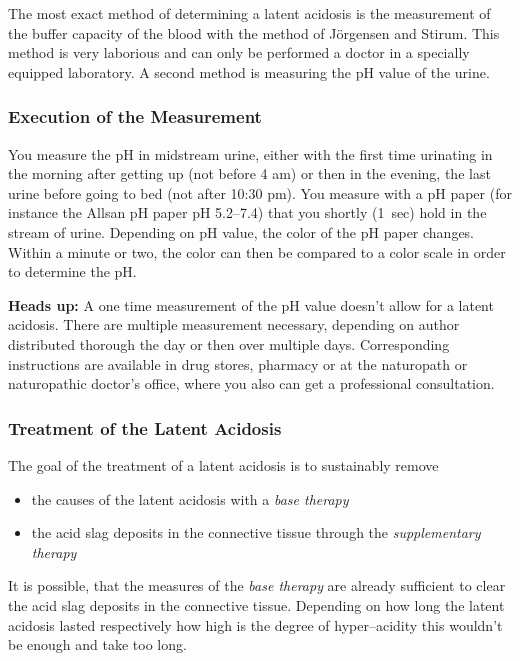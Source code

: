 \documentclass[../main.tex]{subfiles}
\begin{document}
  The most exact method of determining a latent acidosis is the measurement of the buffer capacity of the blood with the method of J\"orgensen and Stirum.
  This method is very laborious and can only be performed a doctor in a specially equipped laboratory.
  A second method is measuring the pH value of the urine.
  
  \subsubsection{Execution of the Measurement}

  You measure the pH in midstream urine, either with the first time urinating in the morning after getting up (not before 4 am) or then in the evening,
  the last urine before going to bed (not after 10:30 pm). You measure with a pH paper (for instance the Allsan pH paper pH 5.2--7.4)
  that you shortly (\SI{1}{sec}) hold in the stream of urine.
  Depending on pH value, the color of the pH paper changes.
  Within a minute or two, the color can then be compared to a color scale in order to determine the pH.

  \textbf{Heads up:} A one time measurement of the pH value doesn't allow for a latent acidosis.
  There are multiple measurement necessary, depending on author distributed thorough the day or then over multiple days.
  Corresponding instructions are available in drug stores, pharmacy or  at the naturopath or naturopathic doctor's office,
  where you also can get a professional consultation.

  \subsubsection{Treatment of the Latent Acidosis}

  The goal of the treatment of a latent acidosis is to sustainably remove
  \begin{itemize}
  \item the causes of the latent acidosis with a \emph{base therapy}
    \item the acid slag deposits in the connective tissue through the \emph{supplementary therapy}
  \end{itemize}

  It is possible, that the measures of the \emph{base therapy} are already sufficient to clear the acid slag deposits in the connective tissue.
  Depending on how long the latent acidosis lasted respectively how high is the degree of hyper--acidity this wouldn't be enough and take too long.
\end{document}
